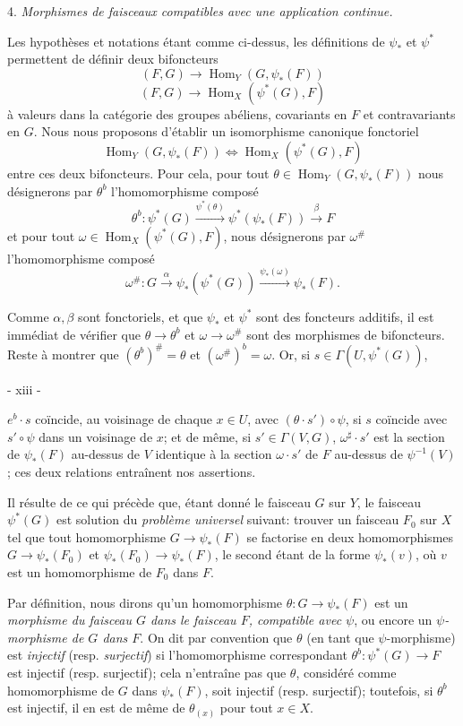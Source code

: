 4. \emph{Morphismes de faisceaux compatibles avec une application continue.}

Les hypothèses et notations étant comme ci-dessus, les définitions de $\psi_*$ et $\psi^*$ permettent de définir deux bifoncteurs
$$(F, G) \to \operatorname{Hom}_Y(G, \psi_*(F))$$
$$(F, G) \to \operatorname{Hom}_X(\psi^*(G), F)$$
à valeurs dans la catégorie des groupes abéliens, covariants en $F$ et contravariants en $G$. Nous nous proposons d'établir un isomorphisme canonique fonctoriel
$$\operatorname{Hom}_Y(G, \psi_*(F)) \iff \operatorname{Hom}_X(\psi^*(G), F)$$
entre ces deux bifoncteurs. Pour cela, pour tout $\theta \in \operatorname{Hom}_Y(G, \psi_*(F))$ nous désignerons par $\theta^b$ l'homomorphisme composé
$$\theta^b : \psi^*(G) \xrightarrow{\psi^*(\theta)} \psi^*(\psi_*(F)) \xrightarrow{\beta} F$$
et pour tout $\omega \in \operatorname{Hom}_X(\psi^*(G), F)$, nous désignerons par $\omega^\#$ l'homomorphisme composé
$$\omega^\# : G \xrightarrow{\alpha} \psi_*(\psi^*(G)) \xrightarrow{\psi_*(\omega)} \psi_*(F).$$

Comme $\alpha, \beta$ sont fonctoriels, et que $\psi_*$ et $\psi^*$ sont des foncteurs additifs, il est immédiat de vérifier que $\theta \to \theta^b$ et $\omega \to \omega^\#$ sont des morphismes de bifoncteurs. Reste à montrer que $(\theta^b)^\# = \theta$ et $(\omega^\#)^b = \omega$. Or, si $s \in \Gamma(U, \psi^*(G))$,

\newpage


- xiii -

$e^b \cdot s$ coïncide, au voisinage de chaque $x \in U$, avec $(\theta \cdot s') \circ \psi$, si $s$ coïncide avec $s' \circ \psi$ dans un voisinage de $x$; et de même, si $s' \in \Gamma(V, G)$, $\omega^\sharp \cdot s'$ est la section de $\psi_*(F)$ au-dessus de $V$ identique à la section $\omega \cdot s'$ de $F$ au-dessus de $\psi^{-1}(V)$; ces deux relations entraînent nos assertions.

Il résulte de ce qui précède que, étant donné le faisceau $G$ sur $Y$, le faisceau $\psi^*(G)$ est solution du \emph{problème universel} suivant: trouver un faisceau $F_0$ sur $X$ tel que tout homomorphisme $G \to \psi_*(F)$ se factorise en deux homomorphismes $G \to \psi_*(F_0)$ et $\psi_*(F_0) \to \psi_*(F)$, le second étant de la forme $\psi_*(v)$, où $v$ est un homomorphisme de $F_0$ dans $F$.

Par définition, nous dirons qu'un homomorphisme $\theta: G \to \psi_*(F)$ est un \emph{morphisme du faisceau $G$ dans le faisceau $F$, compatible avec $\psi$}, ou encore un \emph{$\psi$-morphisme de $G$ dans $F$}. On dit par convention que $\theta$ (en tant que $\psi$-morphisme) est \emph{injectif} (resp. \emph{surjectif}) si l'homomorphisme correspondant $\theta^b: \psi^*(G) \to F$ est injectif (resp. surjectif); cela n'entraîne pas que $\theta$, considéré comme homomorphisme de $G$ dans $\psi_*(F)$, soit injectif (resp. surjectif); toutefois, si $\theta^b$ est injectif, il en est de même de $\theta_{(x)}$ pour tout $x \in X$.


